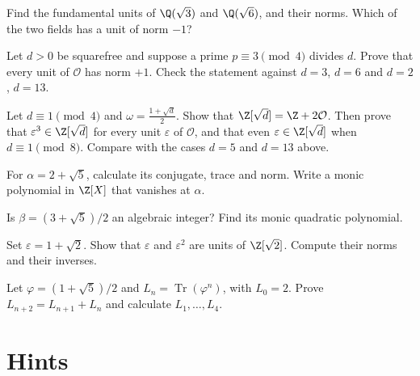 \begin{exercise}[$\star$]\label{ex:t1-units36}
Find the fundamental units of $\Q(\sqrt3)$ and $\Q(\sqrt6)$, and their norms. Which of the two fields has a unit of norm $-1$?
\end{exercise}

\begin{exercise}[$\star\star$]\label{ex:t1-normminus}
Let $d>0$ be squarefree and suppose a prime $p\equiv3\pmod4$ divides $d$. Prove that every unit of $\mathcal O$ has norm $+1$. Check the statement against $d=3$, $d=6$ and $d=2$, $d=13$.
\end{exercise}

\begin{exercise}[$\star\star\star$]\label{ex:t1-cube}
Let $d\equiv1\pmod4$ and $\omega=\frac{1+\sqrt d}2$. Show that $\Z[\sqrt d]=\Z+2\mathcal O$. Then prove that $\varepsilon^3\in\Z[\sqrt d]$ for every unit $\varepsilon$ of $\mathcal O$, and that even $\varepsilon\in\Z[\sqrt d]$ when $d\equiv1\pmod8$. Compare with the cases $d=5$ and $d=13$ above.
\end{exercise}

\begin{exercise}[$\star$]\label{ex:v13-extra-01-1}
For $\alpha=2+\sqrt5$, calculate its conjugate, trace and norm. Write a monic polynomial in $\Z[X]$ that vanishes at $\alpha$.
\end{exercise}

\begin{exercise}[$\star$]\label{ex:v13-extra-01-2}
Is $\beta=(3+\sqrt5)/2$ an algebraic integer? Find its monic quadratic polynomial.
\end{exercise}

\begin{exercise}[$\star\star$]\label{ex:v13-extra-01-3}
Set $\varepsilon=1+\sqrt2$. Show that $\varepsilon$ and $\varepsilon^2$ are units of $\Z[\sqrt2]$. Compute their norms and their inverses.
\end{exercise}

\begin{exercise}[$\star\star\star$]\label{ex:v13-extra-01-4}
Let $\varphi=(1+\sqrt5)/2$ and $L_n=\operatorname{Tr}(\varphi^n)$, with $L_0=2$. Prove $L_{n+2}=L_{n+1}+L_n$ and calculate $L_1,\dots,L_4$.
\end{exercise}

\section{Hints}

